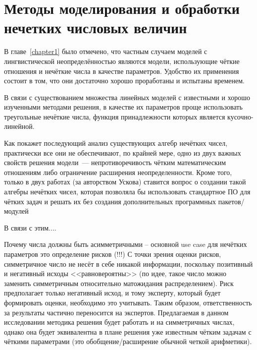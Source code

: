 \chapter{Методы моделирования и обработки нечетких числовых величин}
\label{chapter2}

В главе~\ref{chapter1} было отмечено, что частным случаем моделей с лингвистической неопределённостью являются модели, использующие чёткие отношения и нечёткие числа в качестве параметров. Удобство их применения состоит в том, что они достаточно хорошо проработаны и испытаны временем.

В связи с существованием множества линейных моделей с известными и хорошо изученными методами решения, в качестве их параметров проще использовать треугольные нечёткие числа, функция принадлежности которых является кусочно-линейной.


Как покажет последующий анализ существующих алгебр нечётких чисел, практически все они не обеспечивают, по крайней мере, одно из двух важных свойств решения модели~--- непротиворечивость чётким математическим отношениям либо ограничение расширения неопределенности. Кроме того, только в двух работах (за авторством Ускова) ставится вопрос о создании такой алгебры нечётких чисел, которая позволяла бы использовать стандартное ПО для чётких задач и решать их без создания дополнительных программных пакетов/модулей

В связи с этим.... 

Почему числа должны быть асимметричными – основной use case для нечётких параметров это определение рисков (!!!) С точки зрения оценки рисков, симметричное число не несёт в себе никакой информации, поскольку позитивный и негативный исходы <<равновероятны>> (по идее, такое число можно заменить симметричным относительно матожидания распределением). Риск предполагает только негативный исход, и тому эксперту, который будет формировать оценки, необходимо это учитывать. Таким образом, ответственность за результаты частично переносится на экспертов. Предлагаемая в данном исследовании методика решения будет работать и на симметричных числах, однако она будет эквивалентна в плане решения уже известным чётким задачам с чёткими параметрами (это обобщение/расширение обычной четкой арифметики).

